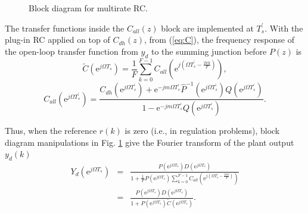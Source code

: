 \documentclass [11pt, proquest] {uwthesis}[2020/02/24]
\begin{document}
\begin{figure}[!ht]
\begin{centering}
\par\end{centering}
\caption{\label{fig:Block-diagram-RC-1}Block diagram for multirate RC.}
\end{figure}

The transfer functions inside the $C_{all}(z)$ block are implemented
at $T_{s}^{'}$. With the plug-in RC applied on top of $C_{dh}(z)$,
from (\ref{eq:C}), the frequency response of the open-loop transfer
function from $y_{d}$ to the summing junction before $P(z)$ is
\begin{equation}
\tilde{C}(\text{e}^{j\Omega T_{s}})=\frac{1}{F}\sum_{k=0}^{F-1}C_{all}(\text{e}^{j(\Omega T_{s}^{'}-\frac{2\pi k}{F})}),\label{eq:Yd-1}
\end{equation}
\noindent
\begin{equation}
C_{all}(\text{e}^{j\Omega T_{s}^{'}})=\frac{C_{dh}(\text{e}^{j\Omega T_{s}^{'}})+\text{e}^{-jm\Omega T_{s}^{'}}\hat{P}^{-1}(\text{e}^{j\Omega T_{s}^{'}})Q(\text{e}^{j\Omega T_{s}^{'}})}{1-\text{e}^{-jm\Omega T_{s}^{'}}Q(\text{e}^{j\Omega T_{s}^{'}})}.\label{eq:C-all-fre}
\end{equation}

Thus, when the reference $r(k)$ is zero (i.e., in regulation problems),
block diagram manipulations in Fig. \ref{fig:Block-diagram-RC-1}
give the Fourier transform of the plant output $y_{d}(k)$
\begin{eqnarray}
Y_{d}(\text{e}^{j\Omega T_{s}}) & = & \frac{P(\text{e}^{j\Omega T_{s}})D(\text{e}^{j\Omega T_{s}})}{1+\frac{1}{F}P(\text{e}^{j\Omega T_{s}})\sum_{k=0}^{F-1}C_{all}(\text{e}^{j(\Omega T_{s}^{'}-\frac{2\pi k}{F})})}\nonumber \\
 & = & \frac{P(\text{e}^{j\Omega T_{s}})D(\text{e}^{j\Omega T_{s}})}{1+P(\text{e}^{j\Omega T_{s}})\tilde{C}(\text{e}^{j\Omega T_{s}})}.\label{eq:Yd}
\end{eqnarray}
\end{document}
